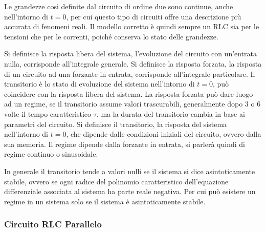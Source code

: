 \documentclass{article}
\numberwithin{equation}{subsection}
\begin{document}
Le grandezze così definite dal circuito di ordine due sono continue, anche nell'intorno di $t=0$, per cui questo tipo di circuiti offre una descrizione più accurata di 
fenomeni reali. Il modello corretto è quindi sempre un RLC sia per le tensioni che per le correnti, poiché conserva lo stato delle grandezze. 

Si definisce la risposta libera del sistema, l'evoluzione del circuito con un'entrata nulla, corrisponde all'integrale generale.  
Si definisce la risposta forzata, la risposta di un circuito ad una forzante in entrata, corrisponde all'integrale particolare. 
Il transitorio è lo stato di evoluzione del sistema nell'intorno di $t=0$, può coincidere con la risposta libera del sistema. 
La risposta forzata può dare luogo ad un regime, se il transitorio assume valori trascurabili, generalmente dopo $3$ o $6$ volte il tempo caratteristico $\tau$, 
ma la durata del transitorio cambia in base ai parametri del circuito. 
Si definisce il transitorio, la risposta del sistema nell'intorno di $t=0$, che 
dipende dalle condizioni iniziali del circuito, ovvero dalla sua memoria. Il regime dipende dalla forzante in entrata, si parlerà quindi di regime continuo o sinusoidale. 

In generale il transitorio tende a valori nulli se il sistema si dice asintoticamente stabile, ovvero se ogni radice del polinomio caratteristico dell'equazione 
differenziale associata al sistema ha parte reale negativa. Per cui può esistere un regime in un sistema solo se il sistema è asintoticamente stabile. 

\subsubsection{Circuito RLC Parallelo}
\end{document}
